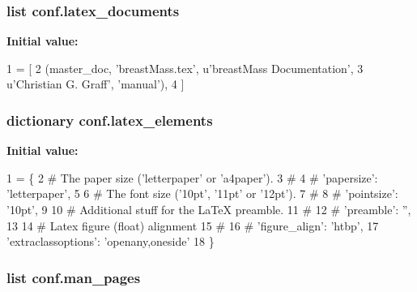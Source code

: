 \hypertarget{namespaceconf_a7812f49970f3de0d15dd7b9b9a10e3a1}{
\subsubsection[{latex\-\_\-documents}]{\setlength{\rightskip}{0pt plus 5cm}list conf.\-latex\-\_\-documents}}\label{namespaceconf_a7812f49970f3de0d15dd7b9b9a10e3a1}
{\bfseries Initial value\-:}
\begin{DoxyCode}
1 = [
2     (master\_doc, \textcolor{stringliteral}{'breastMass.tex'}, \textcolor{stringliteral}{u'breastMass Documentation'},
3      \textcolor{stringliteral}{u'Christian G. Graff'}, \textcolor{stringliteral}{'manual'}),
4 ]
\end{DoxyCode}
\hypertarget{namespaceconf_a33619d385ad23765ac6ebb58bf82d43d}{
\subsubsection[{latex\-\_\-elements}]{\setlength{\rightskip}{0pt plus 5cm}dictionary conf.\-latex\-\_\-elements}}\label{namespaceconf_a33619d385ad23765ac6ebb58bf82d43d}
{\bfseries Initial value\-:}
\begin{DoxyCode}
1 = \{
2     \textcolor{comment}{# The paper size ('letterpaper' or 'a4paper').}
3     \textcolor{comment}{#}
4     \textcolor{comment}{# 'papersize': 'letterpaper',}
5 
6     \textcolor{comment}{# The font size ('10pt', '11pt' or '12pt').}
7     \textcolor{comment}{#}
8     \textcolor{comment}{# 'pointsize': '10pt',}
9 
10     \textcolor{comment}{# Additional stuff for the LaTeX preamble.}
11     \textcolor{comment}{#}
12     \textcolor{comment}{# 'preamble': '',}
13 
14     \textcolor{comment}{# Latex figure (float) alignment}
15     \textcolor{comment}{#}
16     \textcolor{comment}{# 'figure\_align': 'htbp',}
17     \textcolor{stringliteral}{'extraclassoptions'}: \textcolor{stringliteral}{'openany,oneside'}    
18 \}
\end{DoxyCode}
\hypertarget{namespaceconf_a85efc5fee48a26fa2d651f6eeb38fc2b}{
\subsubsection[{man\-\_\-pages}]{\setlength{\rightskip}{0pt plus 5cm}list conf.\-man\-\_\-pages}}\label{namespaceconf_a85efc5fee48a26fa2d651f6eeb38fc2b}
